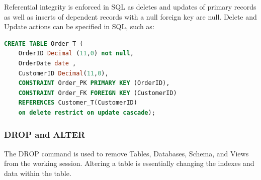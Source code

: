 \documentclass[12pt]{article}
\begin{document}
Referential integrity is enforced in SQL as deletes and updates of primary records as well as inserts of dependent records with a null foreign key are null. Delete and Update actions can be specified in SQL, such as:\\

\begin{lstlisting}[language=SQL]
CREATE TABLE Order_T (
	OrderID Decimal (11,0) not null,
	OrderDate date ,
	CustomerID Decimal(11,0),
	CONSTRAINT Order_PK PRIMARY KEY (OrderID), 
	CONSTRAINT Order_FK FOREIGN KEY (CustomerID)
	REFERENCES Customer_T(CustomerID)
	on delete restrict on update cascade);
\end{lstlisting}

\subsubsection{DROP and ALTER}

The DROP command is used to remove Tables, Databases, Schema, and Views from the working session. Altering a table is essentially changing the indexes and data within the table.

\newpage
\end{document}
